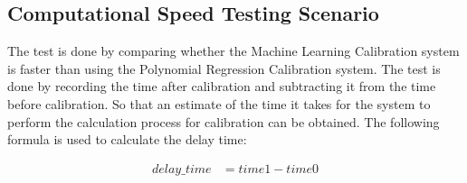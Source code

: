 



\subsection{Computational Speed Testing Scenario}
\label{sec:30}

The test is done by comparing whether the Machine Learning Calibration system is faster than using the Polynomial Regression Calibration system. The test is done by recording the time after calibration and subtracting it from the time before calibration. So that an estimate of the time it takes for the system to perform the calculation process for calibration can be obtained. The following formula is used to calculate the delay time:

\begin{equation}
  \begin{aligned}
    delay\_time &= time1 - time0 \\ 
  \end{aligned}
\end{equation}

